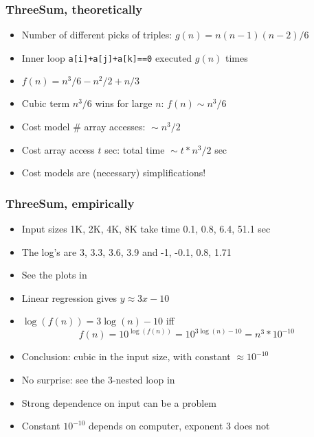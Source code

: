 \documentclass[handout]{beamer}
\newcommand{\git}{https://github.com/marcbezem/INF102/blob/master}
\begin{document}
\frame
  {
    
    \frametitle{ThreeSum, theoretically}

\begin{itemize}[<+->]

\item Number of different picks of triples: $g(n) = n(n-1)(n-2)/6$
\item Inner loop {\tt a[i]+a[j]+a[k]==0} executed $g(n)$ times
\item $f(n) = n^3 / 6 - n^2 / 2 + n / 3$
\item Cubic term $n^3 / 6$ wins for large $n$: $f(n) \sim n^3 / 6$        
\item Cost model \# array accesses: ${} \sim n^3 / 2$
\item Cost array access $t$ sec: total time  ${} \sim  t * n^3 / 2$ sec
\item Cost models are (necessary) simplifications!
\end{itemize}  
}


\frame
  {
    
    \frametitle{ThreeSum, empirically}

\begin{itemize}[<+->]

\item Input sizes 1K, 2K, 4K, 8K take time 0.1, 0.8, 6.4, 51.1 sec
\item The log's are 3, 3.3, 3.6, 3.9 and -1, -0.1, 0.8, 1.71
\item See the plots in \href{\git/lecturenotes/plots_1_4.ods}%
{\color{red}{plot sheet}}
\item Linear regression gives $y \approx 3x -10$
\item $\log(f(n))= 3\log(n) -10$ iff 
         $$f(n)=10^{\log(f(n))} = 10^{3\log(n) - 10} =n^{3}*10^{-10}$$
         
\item Conclusion: cubic in the input size, with constant $\approx 10^{-10}$
\item No surprise: see the 3-nested loop in
\href{http://algs4.cs.princeton.edu/14analysis/ThreeSum.java.html}%
{\color{red}{ThreeSum.java}}
\item Strong dependence on input can be a problem
\item Constant $10^{-10}$ depends on computer, exponent 3 does not

\end{itemize}  
}
\end{document}
